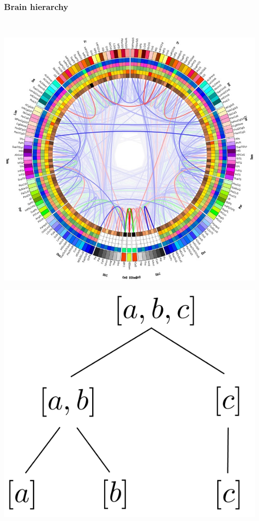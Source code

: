 \documentclass[aspectratio=169]{beamer}
\begin{document}
		\begin{frame}
		\frametitle{Brain hierarchy}
		\quad \\
		
		\begin{minipage}{.4\linewidth}
		\includegraphics[width=\textwidth]{img/connectogram_transparent}\\
		\end{minipage}\hfill
		\begin{minipage}{.4\linewidth}
		\includegraphics[width=\textwidth]{img/treestructuretransparent}
		\end{minipage}
		\end{frame}
		
\end{document}
